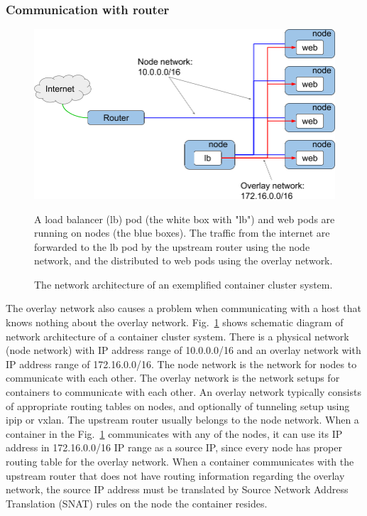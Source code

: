 \subsubsection{Communication with router}

\begin{figure}[h]
\centering
\includegraphics[width=0.8\columnwidth]{Figs/overlay.png}
\caption{The network architecture of an exemplified container cluster system. }

  A load balancer (lb) pod (the white box with "lb") and web pods are running on nodes (the blue boxes).
  The traffic from the internet are forwarded to the lb pod by the upstream router using the node network,
  and the distributed to web pods using the overlay network.

\label{fig:overlay}
\end{figure}

The overlay network also causes a problem when communicating with a host that knows nothing about the overlay network.
Fig.~\ref{fig:overlay} shows schematic diagram of network architecture of a container cluster system. 
There is a physical network (node network) with IP address range of 10.0.0.0/16 and an overlay network with IP address range of 172.16.0.0/16.
The node network is the network for nodes to communicate with each other.
The overlay network is the network setups for containers to communicate with each other.
An overlay network typically consists of appropriate routing tables on nodes, and optionally of tunneling setup using ipip or vxlan.
The upstream router usually belongs to the node network.
When a container in the Fig.~\ref{fig:overlay} communicates with any of the nodes, it can use its IP address in 172.16.0.0/16 IP range as a source IP, since every node has proper routing table for the overlay network.
When a container communicates with the upstream router that does not have routing information regarding the overlay network, the source IP address must be translated by Source Network Address Translation (SNAT) rules on the node the container resides.

